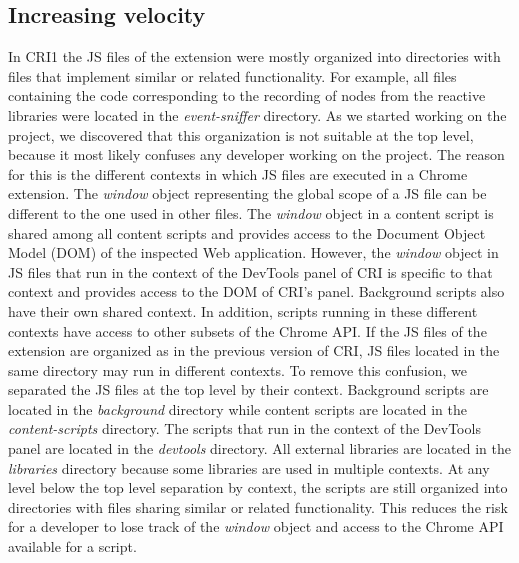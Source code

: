 \subsection{Increasing velocity}
In CRI1 the JS files of the extension were mostly organized into directories with files that implement similar or related functionality. For example, all files containing the code corresponding to the recording of nodes from the reactive libraries were located in the \emph{event-sniffer} directory. As we started working on the project, we discovered that this organization is not suitable at the top level, because it most likely confuses any developer working on the project. The reason for this is the different contexts in which JS files are executed in a Chrome extension. The \emph{window} object representing the global scope of a JS file can be different to the one used in other files. The \emph{window} object in a content script is shared among all content scripts and provides access to the Document Object Model (DOM) of the inspected Web application. However, the \emph{window} object in JS files that run in the context of the DevTools panel of CRI is specific to that context and provides access to the DOM of CRI's panel. Background scripts also have their own shared context. In addition, scripts running in these different contexts have access to other subsets of the Chrome API. If the JS files of the extension are organized as in the previous version of CRI, JS files located in the same directory may run in different contexts. To remove this confusion, we separated the JS files at the top level by their context. Background scripts are located in the \emph{background} directory while content scripts are located in the \emph{content-scripts} directory. The scripts that run in the context of the DevTools panel are located in the \emph{devtools} directory. All external libraries are located in the \emph{libraries} directory because some libraries are used in multiple contexts. At any level below the top level separation by context, the scripts are still organized into directories with files sharing similar or related functionality. This reduces the risk for a developer to lose track of the \emph{window} object and access to the Chrome API available for a script.
